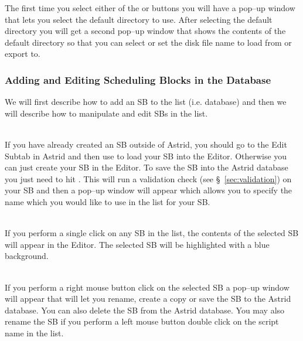 The first time you select either of the  or
 buttons you will have a pop--up window that
lets you select the default directory to use.  After selecting the default
directory you will get a second pop--up window that shows the contents of the
default directory so that you can select or set the disk file name to load
from or export to.

\newpage

\subsubsection{Adding and Editing Scheduling Blocks in the Database}

We will first describe how to add an \gls{SB} to the  list
(i.e. database) and then we will describe how to manipulate and edit \glspl{SB}
in the list.

\begin{description}[leftmargin=*]

\item[Saving a Scheduling Block to the Database]\ \\
If you have already created an \gls{SB} outside of \gls{Astrid}, you should go to the
Edit Subtab in \gls{Astrid} and then use  to load
your \gls{SB} into the Editor.  Otherwise you can just create your \gls{SB} in the
Editor.  To save the \gls{SB} into the \gls{Astrid} database you just need to hit
.  This will run a validation check
(see \S~\ref{sec:validation}) on your \gls{SB} and then a pop--up window will appear
which allows you to specify the name which you would like to use in the list for your
\gls{SB}.

\item[Selecting a Scheduling Block]\ \\
If you perform a single click on any \gls{SB} in the  list,
the contents of the selected \gls{SB} will appear in the Editor.  The selected \gls{SB}
will be highlighted with a blue background.

\item[Mouse--button Actions on the selected Scheduling Block]\ \\
If you perform a right mouse button click on the selected \gls{SB} a pop--up window
will appear that will let you rename, create a copy or save the \gls{SB} to the
\gls{Astrid} database.  You can also delete the \gls{SB} from the \gls{Astrid} database.
You may also rename the \gls{SB} if you perform a left mouse button double click
on the script name in the list.

\end{description}


